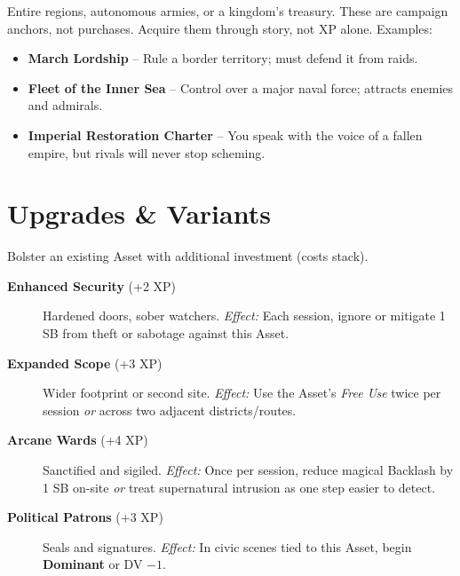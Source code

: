 \begin{tcolorbox}[colback=black!3!white,colframe=black!60!white,title=Legacy Assets (25+ XP),breakable]
Entire regions, autonomous armies, or a kingdom's treasury. These are campaign anchors, not purchases. Acquire them through story, not XP alone. Examples:
\begin{itemize}
  \item \textbf{March Lordship} -- Rule a border territory; must defend it from raids.
  \item \textbf{Fleet of the Inner Sea} -- Control over a major naval force; attracts enemies and admirals.
  \item \textbf{Imperial Restoration Charter} -- You speak with the voice of a fallen empire, but rivals will never stop scheming.
\end{itemize}
\end{tcolorbox}

\section{Upgrades \& Variants}
Bolster an existing Asset with additional investment (costs stack).
\begin{description}
  \item[\textbf{Enhanced Security} (+2 XP)]  Hardened doors, sober watchers. \emph{Effect:} Each session, ignore or mitigate 1 SB from theft or sabotage against this Asset.

  \item[\textbf{Expanded Scope} (+3 XP)]  Wider footprint or second site. \emph{Effect:} Use the Asset's \emph{Free Use} twice per session \emph{or} across two adjacent districts/routes.

  \item[\textbf{Arcane Wards} (+4 XP)]  Sanctified and sigiled. \emph{Effect:} Once per session, reduce magical Backlash by 1 SB on-site \emph{or} treat supernatural intrusion as one step easier to detect.

  \item[\textbf{Political Patrons} (+3 XP)]  Seals and signatures. \emph{Effect:} In civic scenes tied to this Asset, begin \textbf{Dominant} or DV $-1$.
\end{description}

